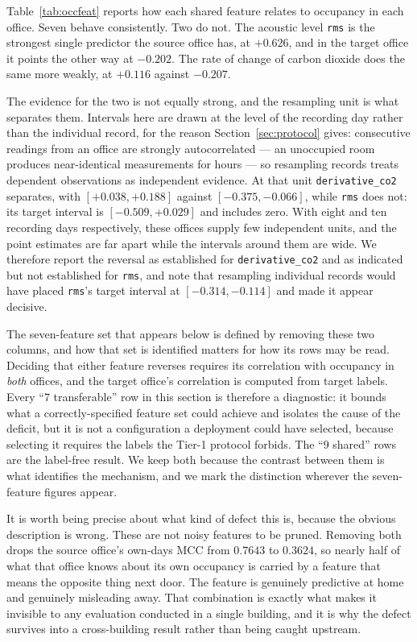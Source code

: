 \documentclass[a4paper,fleqn]{cas-dc}
\begin{document}
Table~\ref{tab:occfeat} reports how each shared feature relates to occupancy in each
office. Seven behave consistently. Two do not. The acoustic level \texttt{rms} is the
strongest single predictor the source office has, at $+0.626$, and in the target office it
points the other way at $-0.202$. The rate of change of carbon dioxide does the same more
weakly, at $+0.116$ against $-0.207$.

The evidence for the two is not equally strong, and the resampling unit is what separates
them. Intervals here are drawn at the level of the recording day rather than the
individual record, for the reason Section~\ref{sec:protocol} gives: consecutive readings
from an office are strongly autocorrelated --- an unoccupied room produces near-identical
measurements for hours --- so resampling records treats dependent observations as
independent evidence. At that unit \texttt{derivative\_co2} separates, with
$[+0.038,+0.188]$ against $[-0.375,-0.066]$, while \texttt{rms} does not: its target
interval is $[-0.509,+0.029]$ and includes zero. With eight and ten recording days
respectively, these offices supply few independent units, and the point estimates are far
apart while the intervals around them are wide. We therefore report the reversal as
established for \texttt{derivative\_co2} and as indicated but not established for
\texttt{rms}, and note that resampling individual records would have placed
\texttt{rms}'s target interval at $[-0.314,-0.114]$ and made it appear decisive.

The seven-feature set that appears below is defined by removing these two columns, and
how that set is identified matters for how its rows may be read. Deciding that either feature
reverses requires its correlation with occupancy in \emph{both} offices, and the target
office's correlation is computed from target labels. Every ``$7$ transferable''
row in this section is therefore a diagnostic: it bounds what a correctly-specified feature
set could achieve and isolates the cause of the deficit, but it is not a configuration a
deployment could have selected, because selecting it requires the labels the Tier-1 protocol
forbids. The ``$9$ shared'' rows are the label-free result. We keep both because the
contrast between them is what identifies the mechanism, and we mark the distinction wherever
the seven-feature figures appear.

It is worth being precise about what kind of defect this is, because the obvious
description is wrong. These are not noisy features to be pruned. Removing both drops the
source office's own-days MCC from $0.7643$ to $0.3624$, so nearly half of what that office
knows about its own occupancy is carried by a feature that means the opposite thing next
door. The feature is genuinely predictive at home and genuinely misleading away. That
combination is exactly what makes it invisible to any evaluation conducted in a single
building, and it is why the defect survives into a cross-building result rather than being
caught upstream.
\end{document}

